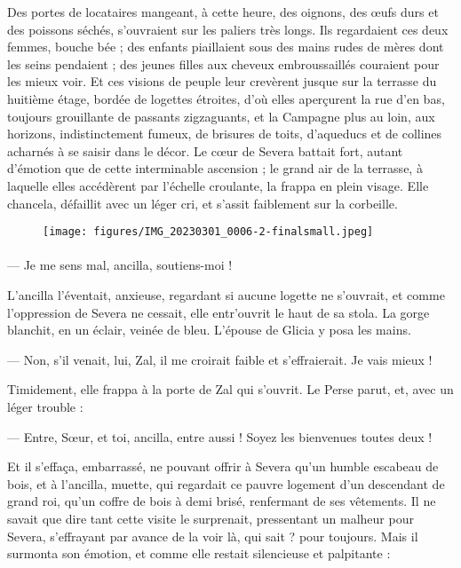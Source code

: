 \documentclass[a4paper, 11pt, oneside, polutonikogreek, french]{article}
\begin{document}
Des portes de locataires mangeant, à cette heure, des oignons, des œufs durs et des poissons séchés, s'ouvraient sur les paliers très longs. Ils regardaient ces deux femmes, bouche bée ; des enfants piaillaient sous des mains rudes de mères dont les seins pendaient ; des jeunes filles aux cheveux embroussaillés couraient pour les mieux voir. Et ces visions de peuple leur crevèrent jusque sur la terrasse du huitième étage, bordée de logettes étroites, d'où elles aperçurent la rue d'en bas, toujours grouillante de passants zigzaguants, et la Campagne plus au loin, aux horizons, indistinctement fumeux, de brisures de toits, d'aqueducs et de collines acharnés à se saisir dans le décor. Le cœur de Severa battait fort, autant d'émotion que de cette interminable ascension ; le grand air de la terrasse, à laquelle elles accédèrent par l'échelle croulante, la frappa en plein visage. Elle chancela, défaillit avec un léger cri, et s'assit faiblement sur la corbeille.
\clearpage
\begin{landscape}
\pagestyle{fancy}
\fancyhf{}
\cfoot{\thepage}
\begin{figure}[H]
\centering
\texttt{[image: figures/IMG\_20230301\_0006-2-finalsmall.jpeg]}
\end{figure}
\end{landscape}
\clearpage
\paragraph{}
--- Je me sens mal, ancilla, soutiens-moi !

L'ancilla l'éventait, anxieuse, regardant si aucune logette ne s'ouvrait, et comme l'oppression de Severa ne cessait, elle entr'ouvrit le haut de sa stola. La gorge blanchit, en un éclair, veinée de bleu. L'épouse de Glicia y posa les mains.

--- Non, s'il venait, lui, Zal, il me croirait faible et s'effraierait. Je vais mieux !

Timidement, elle frappa à la porte de Zal qui s'ouvrit. Le Perse parut, et, avec un léger trouble :

--- Entre, Sœur, et toi, ancilla, entre aussi ! Soyez les bienvenues toutes deux !

Et il s'effaça, embarrassé, ne pouvant offrir à Severa qu'un humble escabeau de bois, et à l'ancilla, muette, qui regardait ce pauvre logement d'un descendant de grand roi, qu'un coffre de bois à demi brisé, renfermant de ses vêtements. Il ne savait que dire tant cette visite le surprenait, pressentant un malheur pour Severa, s'effrayant par avance de la voir là, qui sait ? pour toujours. Mais il surmonta son émotion, et comme elle restait silencieuse et palpitante :
\end{document}
